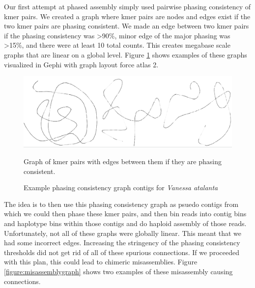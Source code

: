 {\par{
Our first attempt at phased assembly simply used pairwise phasing consistency of kmer pairs. We created a graph where kmer pairs are nodes and edges exist if the two kmer pairs are phasing consistent. We made an edge between two kmer pairs if the phasing consistency was >90\%, minor edge of the major phasing was >15\%, and there were at least 10 total counts. This creates megabase scale graphs that are linear on a global level. Figure \ref{figure:phasegraph} shows examples of these graphs visualized in Gephi with graph layout force atlas 2\cite{gephi}\cite{forceatlas2}. 
}

\begin{figure}[htbp!]
\caption{Example phasing consistency graph contigs for \textit{Vanessa atalanta}}
\label{figure:phasegraph}
\begin{centering}
\includegraphics[width=\textwidth]{phasinggraph.png}
\par{Graph of kmer pairs with edges between them if they are phasing consistent. }
\end{centering}
\end{figure}

\par{
The idea is to then use this phasing consistency graph as psuedo contigs from which we could then phase these kmer pairs, and then bin reads into contig bins and haplotype bins within those contigs and do haploid assembly of those reads. Unfortunately, not all of these graphs were globally linear. This meant that we had some incorrect edges. Increasing the stringency of the phasing consistency thresholds did not get rid of all of these spurious connections. If we proceeded with this plan, this could lead to chimeric misassemblies. Figure \ref{figure:misassemblygraph} shows two examples of these misassembly causing connections.
}

}
